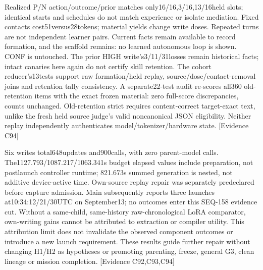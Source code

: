 \documentclass[11pt]{article}
\newcommand{\ev}[1]{\textsf{[Evidence #1]}}
\begin{document}
Realized P/N action/outcome/prior matches only16/16,3/16,13/16held slots;
identical starts and schedules do not match experience or isolate mediation.
Fixed contacts cost51versus28tokens; material yields change write doses.
Repeated turns are not independent learner pairs. Current facts remain available
to record formation, and the scaffold remains: no learned autonomous loop is
shown. CONF is untouched. The prior HIGH write's3/11/31losses remain historical
facts; intact canaries here again do not certify skill retention. The cohort
reducer's13tests support raw formation/held replay, source/dose/contact-removal
joins and retention tally consistency. A separate22-test audit re-scores all360
old-retention items with the exact frozen material: zero full-score discrepancies,
counts unchanged. Old-retention strict requires content-correct target-exact
text, unlike the fresh held source judge's valid noncanonical JSON eligibility.
Neither replay independently authenticates model/tokenizer/hardware state. \ev{C94}

Six writes total648updates and900calls, with zero parent-model calls.
The1127.793/1087.217/1063.341s budget elapsed values include preparation,
not postlaunch controller runtime;
821.673s summed generation is nested, not additive device-active time.
Own-source replay repair was separately predeclared before capture admission.
Main subsequently reports three launches at10:34:12/21/30UTC on September13;
no outcomes enter this SEQ-158 evidence cut. Without a same-child, same-history
raw-chronological LoRA comparator, own-writing gains cannot be attributed to
extraction or compiler utility. This attribution limit does not invalidate the
observed component outcomes or introduce a new launch requirement.
These results guide further repair without changing H1/H2 as hypotheses or
promoting parenting, freeze, general G3, clean lineage or mission completion.
\ev{C92,C93,C94}
\end{document}
